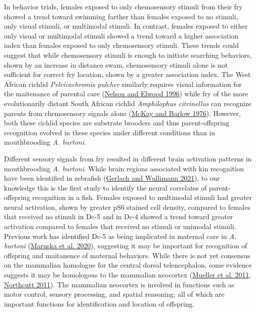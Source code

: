 \documentclass[
  12pt,
]{article}
\begin{document}
In behavior trials, females exposed to only chemosensory stimuli from their fry showed a trend toward swimming farther than females exposed to no stimuli, only visual stimuli, or multimodal stimuli. In contrast, females exposed to either only visual or multimodal stimuli showed a trend toward a higher association index than females exposed to only chemosensory stimuli. These trends could suggest that while chemosensory stimuli is enough to initiate searching behaviors, shown by an increase in distance swam, chemosensory stimuli alone is not sufficient for correct fry location, shown by a greater association index. The West African cichlid \emph{Pelvicachromis pulcher} similarly requires visual information for the maitenance of parental care (\protect\hyperlink{ref-RN28}{Nelson and Elwood 1996}) while fry of the more evolutionarily distant South African cichlid \emph{Amphilophus citrinellus} can recognize parents from chemosensory signals alone (\protect\hyperlink{ref-RN29}{McKay and Barlow 1976}). However, both these cichlid species are substrate brooders and thus parent-offspring recognition evolved in these species under different conditions than in mouthbrooding \emph{A. burtoni}.

Different sensory signals from fry resulted in different brain activation patterns in mouthbrooding \emph{A. burtoni}. While brain regions associated with kin recognition have been identified in zebrafish (\protect\hyperlink{ref-RN30}{Gerlach and Wullimann 2021}), to our knowledge this is the first study to identify the neural correlates of parent-offspring recognition in a fish. Females exposed to multimodal stimuli had greater neural activation, shown by greater pS6 stained cell density, compared to females that received no stimuli in Dc-5 and in Dc-4 showed a trend toward greater activation compared to females that received no stimuli or unimodal stimuli. Previous work has identified Dc-5 as being implicated in maternal care in \emph{A. burtoni} (\protect\hyperlink{ref-RN18}{Maruska et al. 2020}), suggesting it may be important for recognition of offspring and maitanence of maternal behaviors. While there is not yet consensus on the mammalian homologue for the central dorsal telencephalon, some evidence suggests it may be homologous to the mammalian neocortex (\protect\hyperlink{ref-RN31}{Mueller et al. 2011}, \protect\hyperlink{ref-RN32}{Northcutt 2011}). The mammalian neocortex is involved in functions such as motor control, sensory processing, and spatial reasoning, all of which are important functions for identification and location of offspring.
\end{document}
